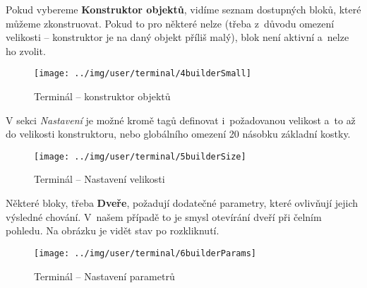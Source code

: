 \FloatBarrier

Pokud vybereme \textbf{Konstruktor objektů}, vidíme seznam dostupných bloků, které můžeme zkonstruovat. Pokud to pro některé nelze (třeba z~důvodu omezení velikosti -- konstruktor je na daný objekt příliš malý), blok není aktivní a~nelze ho zvolit.


\begin{figure}[!ht]\centering
\texttt{[image: ../img/user/terminal/4builderSmall]}

\caption{Terminál -- konstruktor objektů}
\label{fig:user_terminal_4builderSmall}

\end{figure}

\FloatBarrier

V sekci \textit{Nastavení} je možné kromě tagů definovat i~požadovanou velikost a~to až do velikosti konstruktoru, nebo globálního omezení 20 násobku základní kostky.

\begin{figure}[!ht]\centering
\texttt{[image: ../img/user/terminal/5builderSize]}

\caption{Terminál -- Nastavení velikosti}
\label{fig:user_terminal_5builderSize}

\end{figure}

\FloatBarrier

Některé bloky, třeba \textbf{Dveře}, požadují dodatečné parametry, které ovlivňují jejich výsledné chování. V~našem případě to je smysl otevírání dveří při čelním pohledu. Na obrázku je vidět stav po rozkliknutí.

\begin{figure}[!ht]\centering
\texttt{[image: ../img/user/terminal/6builderParams]}

\caption{Terminál -- Nastavení parametrů}
\label{fig:user_terminal_6builderParams}

\end{figure}

\FloatBarrier